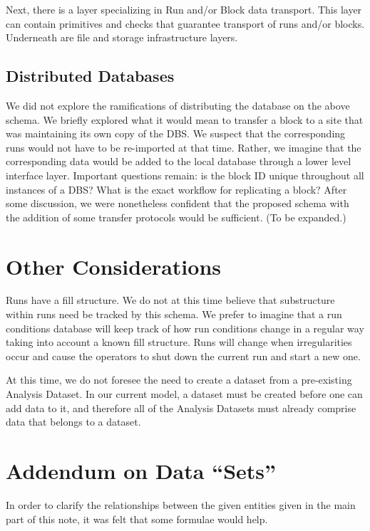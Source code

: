 \documentclass{cmspaper}
\begin{document}
Next, there is a layer specializing in Run and/or Block data transport.  
This layer can contain primitives and checks that guarantee transport of 
runs and/or blocks.  Underneath are file and storage infrastructure layers.

\subsection{Distributed Databases}

We did not explore the ramifications of distributing the database on the above schema.  
We briefly explored what it would mean to transfer a block to a site that was maintaining 
its own copy of the DBS.  We suspect that the corresponding runs would not have to be 
re-imported at that time.  Rather, we imagine that the corresponding data would be added 
to the local database through a lower level interface layer.  Important questions remain:  
is the block ID unique throughout all instances of a DBS?  What is the exact workflow for 
replicating a block?   After some discussion, we were nonetheless confident that the 
proposed schema with the addition of some transfer protocols would be sufficient.  
(To be expanded.) 

\section{Other Considerations}

Runs have a fill structure.  We do not at this time believe that substructure within 
runs need be tracked by this schema.  We prefer to imagine that a run conditions 
database will keep track of how run conditions change in a regular way taking into 
account a known fill structure.  Runs will change when irregularities occur and cause 
the operators to shut down the current run and start a new one.  

At this time, we do not foresee the need to create a dataset from a 
pre-existing Analysis Dataset.  In our current model, a dataset must be created 
before one can add data to it, and therefore all of the Analysis Datasets must 
already comprise data that belongs to a dataset.  


\appendix

\section{Addendum on Data ``Sets''}\label{appendix}

In order to clarify the relationships between the given entities given in the main part of 
this note, it was felt that some formulae would help. 
\end{document}
